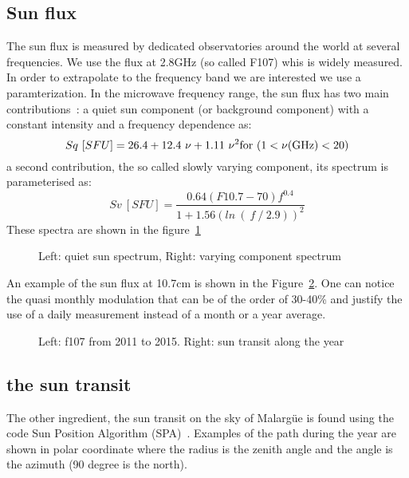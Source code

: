 \subsection{Sun flux}
The  sun  flux  is  measured  by dedicated  observatories  around  the
world\cite{nobeyama,canadianobs}  at several  frequencies. We  use the
flux at 2.8GHz  (so called F107) whis is widely  measured. In order to
extrapolate  to  the  frequency  band  we  are  interested  we  use  a
paramterization. In  the microwave frequency  range, the sun  flux has
two  main contributions~\cite{solarflux}:  a quiet  sun  component (or
background  component)  with  a  constant intensity  and  a  frequency
dependence as:
\begin{equation} 
 Sq \  [SFU] =  26.4 +  12.4 \ \nu  + 1.11\  \nu^2 \\ \rm  for \  (1 <
 \nu(GHz) < 20)
\end{equation}
a    second    contribution,   the    so    called   slowly    varying
component, its spectrum is parameterised as:
\begin{equation}
    Sv  \ [SFU]= \frac{0.64 ( F10.7 - 70 ) f^{0.4}}{ 1 + 1.56 ( ln \ ( \ f  \ / \  2.9 ) )^2}
\end{equation}
These spectra are shown in the figure~\ref{fig:spectra}
\begin{figure}[!ht]
  \centering
  \hspace*{-3ex}
  \caption{Left: quiet sun spectrum, Right: varying component spectrum}
  \label{fig:spectra}
\end{figure}
An   example  of   the   sun  flux   at   10.7cm  is   shown  in   the
Figure~\ref{fig:f107}. One  can notice  the quasi monthly  modulation that
can  be of  the  order  of 30-40\%  and  justify the  use  of a  daily
measurement instead of a month or a year average.
\begin{figure}[!ht]
  \centering
  \hspace*{-3ex}
  \caption{Left: f107 from 2011 to  2015. Right: sun transit along the
    year}
  \label{fig:f107}
\end{figure}
\subsection{the sun transit}
The  other ingredient, the  sun transit  on the  sky of  Malarg\"ue is
found using the code Sun Position Algorithm (SPA)~\cite{spa}. Examples
of the  path during the year  are shown in polar  coordinate where the
radius is the zenith angle and  the angle is the azimuth (90 degree is
the north).
